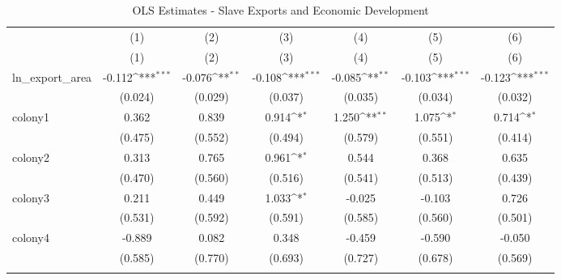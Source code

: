 \begin{table}[htbp]\centering
\def\sym#1{\ifmmode^{#1}\else\(^{#1}\)\fi}
\caption{OLS Estimates - Slave Exports and Economic Development}
\begin{tabular}{l*{6}{c}}
\toprule
            &\multicolumn{1}{c}{(1)}&\multicolumn{1}{c}{(2)}&\multicolumn{1}{c}{(3)}&\multicolumn{1}{c}{(4)}&\multicolumn{1}{c}{(5)}&\multicolumn{1}{c}{(6)}\\
            &\multicolumn{1}{c}{(1)}&\multicolumn{1}{c}{(2)}&\multicolumn{1}{c}{(3)}&\multicolumn{1}{c}{(4)}&\multicolumn{1}{c}{(5)}&\multicolumn{1}{c}{(6)}\\
\midrule
ln\_export\_area&      -0.112\sym{***}&      -0.076\sym{**} &      -0.108\sym{***}&      -0.085\sym{**} &      -0.103\sym{***}&      -0.123\sym{***}\\
            &     (0.024)         &     (0.029)         &     (0.037)         &     (0.035)         &     (0.034)         &     (0.032)         \\
\addlinespace
colony1     &       0.362         &       0.839         &       0.914\sym{*}  &       1.250\sym{**} &       1.075\sym{*}  &       0.714\sym{*}  \\
            &     (0.475)         &     (0.552)         &     (0.494)         &     (0.579)         &     (0.551)         &     (0.414)         \\
\addlinespace
colony2     &       0.313         &       0.765         &       0.961\sym{*}  &       0.544         &       0.368         &       0.635         \\
            &     (0.470)         &     (0.560)         &     (0.516)         &     (0.541)         &     (0.513)         &     (0.439)         \\
\addlinespace
colony3     &       0.211         &       0.449         &       1.033\sym{*}  &      -0.025         &      -0.103         &       0.726         \\
            &     (0.531)         &     (0.592)         &     (0.591)         &     (0.585)         &     (0.560)         &     (0.501)         \\
\addlinespace
colony4     &      -0.889         &       0.082         &       0.348         &      -0.459         &      -0.590         &      -0.050         \\
            &     (0.585)         &     (0.770)         &     (0.693)         &     (0.727)         &     (0.678)         &     (0.569)         \\
\addlinespace

\end{tabular}
\end{table}

